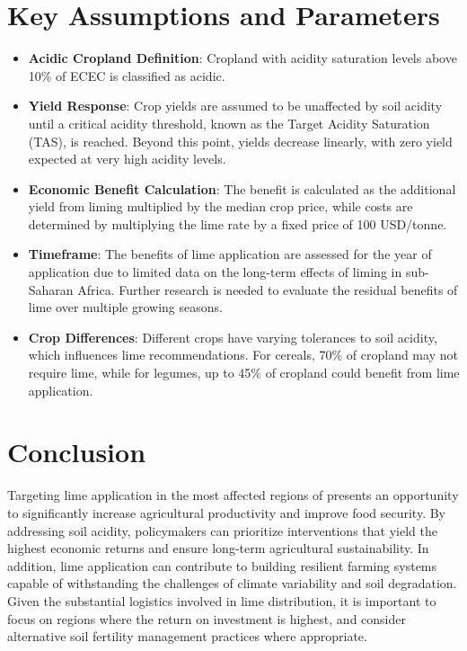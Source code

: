 \documentclass[openany
]{book}
\begin{document}
\section*{Key Assumptions and Parameters}
\begin{itemize}
\item \textbf{Acidic Cropland Definition}: Cropland with acidity saturation levels above 10\% of ECEC is classified as acidic.
\item \textbf{Yield Response}: Crop yields are assumed to be unaffected by soil acidity until a critical acidity threshold, known as the Target Acidity Saturation (TAS), is reached. Beyond this point, yields decrease linearly, with zero yield expected at very high acidity levels.
\item \textbf{Economic Benefit Calculation}: The benefit is calculated as the additional yield from liming multiplied by the median crop price, while costs are determined by multiplying the lime rate by a fixed price of 100 USD/tonne.
\item \textbf{Timeframe}: The benefits of lime application are assessed for the year of application due to limited data on the long-term effects of liming in sub-Saharan Africa. Further research is needed to evaluate the residual benefits of lime over multiple growing seasons.
\item \textbf{Crop Differences}: Different crops have varying tolerances to soil acidity, which influences lime recommendations. For cereals, 70\% of cropland may not require lime, while for legumes, up to 45\% of cropland could benefit from lime application.
\end{itemize}

\section*{Conclusion}
Targeting lime application in the most affected regions of \CountryName presents an opportunity to significantly increase agricultural productivity and improve food security. By addressing soil acidity, policymakers can prioritize interventions that yield the highest economic returns and ensure long-term agricultural sustainability. In addition, lime application can contribute to building resilient farming systems capable of withstanding the challenges of climate variability and soil degradation. Given the substantial logistics involved in lime distribution, it is important to focus on regions where the return on investment is highest, and consider alternative soil fertility management practices where appropriate.
\end{document}
